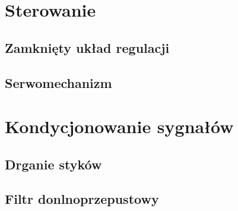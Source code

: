 \section{Sterowanie}

\subsection{Zamknięty układ regulacji}
\subsection{Serwomechanizm}
\section{Kondycjonowanie sygnałów}
\subsection{Drganie styków}
\subsection{Filtr donlnoprzepustowy}